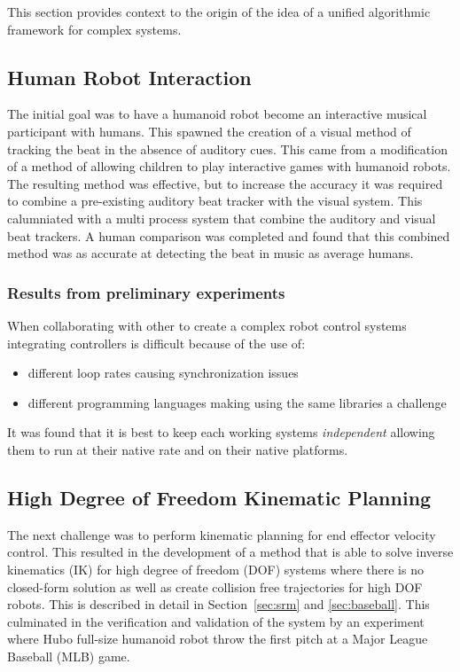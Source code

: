 This section provides context to the origin of the idea of a unified algorithmic framework for complex systems.

\subsection{Human Robot Interaction}
The initial goal was to have a humanoid robot become an interactive musical participant with humans.
This spawned the creation of a visual method of tracking the beat in the absence of auditory cues\cite{5686847}.
This came from a modification of a method of allowing children to play interactive games with humanoid robots\cite{lofaroGamesRobot}.
The resulting method was effective, but to increase the accuracy it was required to combine a pre-existing auditory beat tracker with the visual system.
This calumniated with a multi process system that combine the auditory and visual beat trackers\cite{lofaroIASTED2011,6094987,lofaroEURASIP2011}.
A human comparison was completed and found that this combined method was as accurate at detecting the beat in music as average humans.

\subsubsection{Results from preliminary experiments}
When collaborating with other to create a complex robot control systems integrating controllers is difficult because of the use of:
\begin{itemize}
\item different loop rates causing synchronization issues
\item different programming languages making using the same libraries a challenge
\end{itemize}

It was found that it is best to keep each working systems \textit{independent} allowing them to run at their native rate and on their native platforms\cite{ach}.



\subsection{High Degree of Freedom Kinematic Planning}
The next challenge was to perform kinematic planning for end effector velocity control. 
This resulted in the development of a method that is able to solve inverse kinematics (IK) for high degree of freedom (DOF) systems where there is no closed-form solution as well as create collision free trajectories for high DOF robots\cite{6385987}.
This is described in detail in Section~\ref{sec:srm} and \ref{sec:baseball}.
This culminated in the verification and validation of the system by an experiment where Hubo full-size humanoid robot throw the first pitch at a Major League Baseball (MLB) game\cite{lofaroHumanoids2012,6462956}.

